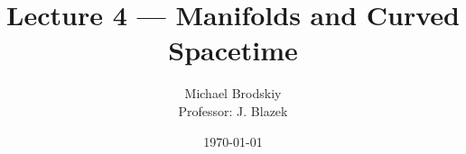 


\title{Lecture 4 — Manifolds and Curved Spacetime}
\date{\today}
\author{Michael Brodskiy\\ \small Professor: J. Blazek}



\maketitle

